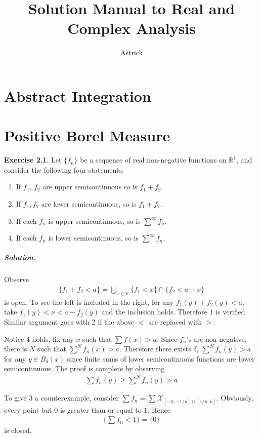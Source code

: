 \documentclass[10pt,a4paper]{book}
\author{Astrick}
\date{}
\title{Solution Manual to Real and Complex Analysis}
\theoremstyle{definition}
\newtheorem{exercise}{Exercise}[chapter]
\begin{document}
	\maketitle
	\tableofcontents
	\chapter{Abstract Integration}

	\chapter{Positive Borel Measure}
	\begin{exercise}
		Let $ \{f_n\} $ be a sequence of real non-negative functions on $ \mathbb R^{1} $, and consider the following
		four statements:
		\begin{enumerate}
			\item If $ f_1 $, $ f_2 $ are upper semicontinuous so is $ f_1 + f_2 $.
			\item If $ f_1, f_2 $ are lower semicontinuous, so is $ f_1 + f_2 $.
			\item If each $ f_n $ is upper semicontinuous, so is $ \sum^{\infty} f_n $.
			\item If each $ f_n $ is lower semicontinuous, so is $ \sum^{\infty} f_n $.
		\end{enumerate}
		\paragraph{Solution. }  Observe
		\begin{align*}
		\{f_1 + f_2 < a\} = \bigcup_{x \in \mathbb R} \{f_1 < x\} \cap \{f_2 < a - x\}
		\end{align*}
		is open. To see the left is included in the right, for any $ f_1(y) + f_2(y) < a $, take $ f_1(y) < x < a - f_2(y) $ and the
		inclusion holds. Therefore 1 is verified. Similar argument goes with 2 if the above $ < $ are replaced with $ > $.

		Notice 4 holds, fix any $ x $ such that $ \sum f(x) > a $. Since $ f_n $'s are non-negative, there is $ N $ such that
		$ \sum^{N} f_n(x) > a $. Therefore there exists $\delta$, $ \sum^N f_n(y) > a $ for any $ y \in B_\delta(x) $ since
		finite sums of lower semicontinuous functions are lower semicontinuous. The proof is complete by observing
		\begin{align*}
		\sum f_n(y) \ge \sum^N f_n(y) > a
		\end{align*}

		To give 3 a counterexample, consider $ \sum f_n = \sum \mathcal X_{[-n, -1/n] \cup [1/n, n]} $.
		Obviously, every point but $ 0 $ is greater than or equal to $ 1 $. Hence
		\begin{align*}
		\{\sum f_n < 1 \} = \{0\}
		\end{align*}
		is closed.
	\end{exercise}
\end{document}
